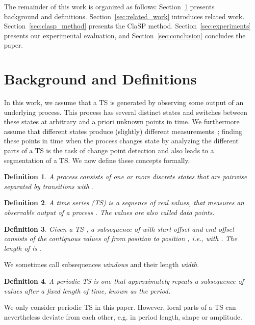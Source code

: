 \documentclass[pdflatex,sn-basic]{sn-jnl}
\newtheorem{definition}{Definition}
\begin{document}
The remainder of this work is organized as follows: Section~\ref{sec:background} presents background and definitions. Section~\ref{sec:related_work} introduces related work. Section~\ref{sec:clasp_method} presents the ClaSP method. Section~\ref{sec:experiments} presents our experimental evaluation, and Section~\ref{sec:conclusion} concludes the paper.


\section{Background and Definitions}\label{sec:background}

In this work, we assume that a TS is generated by observing some output of an underlying process. This process has several distinct states and switches between these states at arbitrary and a priori unknown points in time. We furthermore assume that different states produce (slightly) different measurements~\citep{Gharghabi2018DomainAO}; finding these points in time when the process changes state by analyzing the different parts of a TS is the task of change point detection and also leads to a segmentation of a TS. We now define these concepts formally.

\begin{definition}
A process  consists of one or more discrete states  that are pairwise separated by transitions  with .
\end{definition}

\begin{definition}
A \emph{time series (TS)}  is a sequence of  real values,  that measures an observable output of a process . The values are also called data points.
\end{definition}

\begin{definition}
Given a TS , a \emph{subsequence}  of  with start offset  and end offset  consists of the contiguous values of  from position  to position , i.e.,  with . The length of  is .
\end{definition}

We sometimes call subsequences \emph{windows} and their length \emph{width}.

\begin{definition}
A \emph{periodic} TS is one that approximately repeats a subsequence of values after a fixed length of time, known as the period.
\end{definition}

We only consider periodic TS in this paper. However, local parts of a TS can nevertheless deviate from each other, e.g. in period length, shape or amplitude. 
\end{document}

